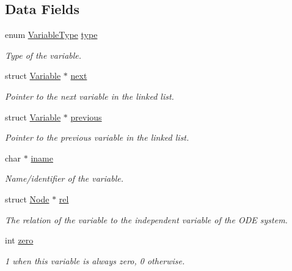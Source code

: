 \subsection*{Data Fields}
\begin{DoxyCompactItemize}
\item 
enum \hyperlink{tree_8h_ac62972ff1b21a037e56530cde67309ab}{Variable\-Type} \hyperlink{structVariable_a6d3af05ac5e896c45aeb8834fcbf84f4}{type}
\begin{DoxyCompactList}\small\item\em Type of the variable. \end{DoxyCompactList}\item 
struct \hyperlink{structVariable}{Variable} $\ast$ \hyperlink{structVariable_ac6387180163bef05cf8ea37a4fbd0682}{next}
\begin{DoxyCompactList}\small\item\em Pointer to the next variable in the linked list. \end{DoxyCompactList}\item 
struct \hyperlink{structVariable}{Variable} $\ast$ \hyperlink{structVariable_ad27df2f2e773678c5804cc233343aed1}{previous}
\begin{DoxyCompactList}\small\item\em Pointer to the previous variable in the linked list. \end{DoxyCompactList}\item 
char $\ast$ \hyperlink{structVariable_a76c70ae7ac3d58ebe41da968fedb8093}{iname}
\begin{DoxyCompactList}\small\item\em Name/identifier of the variable. \end{DoxyCompactList}\item 
struct \hyperlink{structNode}{Node} $\ast$ \hyperlink{structVariable_adf9b74cb9b4f3a80e8af89e50bd11975}{rel}
\begin{DoxyCompactList}\small\item\em The relation of the variable to the independent variable of the O\-D\-E system. \end{DoxyCompactList}\item 
int \hyperlink{structVariable_a627f44b64b5d8d3ae8cb6a675f164405}{zero}
\begin{DoxyCompactList}\small\item\em 1 when this variable is always zero, 0 otherwise. \end{DoxyCompactList}\end{DoxyCompactItemize}


